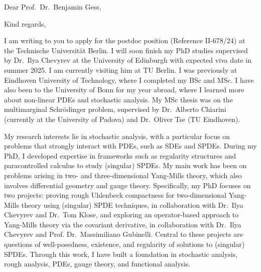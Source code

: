 \documentclass[11pt,a4paper]{moderncv}
\begin{document}
\date{\today}
\opening{Dear Prof.\ Dr.\ Benjamin Gess,}
\closing{Kind regards,\vspace{-2em}}

\makelettertitle
\justifying
I am writing to you to apply for the postdoc position (Reference II-678/24) at the Technische Universität Berlin. I will soon finish my PhD studies supervised by Dr.\ Ilya Chevyrev at the University of Edinburgh with expected viva date in summer 2025. I am currently visiting him at TU Berlin. I was previously at Eindhoven University of Technology, where I completed my BSc and MSc. I have also been to the University of Bonn for my year abroad, where I learned more about non-linear PDEs and stochastic analysis. My MSc thesis was on the multimarginal Schrödinger problem, supervised by Dr.\ Alberto Chiarini (currently at the University of Padova) and Dr.\ Oliver Tse (TU Eindhoven).

My research interests lie in stochastic analysis, with a particular focus on problems that strongly interact with PDEs, such as SDEs and SPDEs. During my PhD, I developed expertise in frameworks such as regularity structures and paracontrolled calculus to study (singular) SPDEs. My main work has been on problems arising in two- and three-dimensional Yang-Mills theory, which also involves differential geometry and gauge theory. Specifically, my PhD focuses on two projects: proving rough Uhlenbeck compactness for two-dimensional Yang-Mills theory using (singular) SPDE techniques, in collaboration with Dr.\ Ilya Chevyrev and Dr.\ Tom Klose, and exploring an operator-based approach to Yang-Mills theory via the covariant derivative, in collaboration with Dr.\ Ilya Chevyrev and Prof. Dr.\ Massimiliano Gubinelli.  Central to these projects are questions of well-posedness, existence, and regularity of solutions to (singular) SPDEs. Through this work, I have built a foundation in stochastic analysis, rough analysis, PDEs, gauge theory, and functional analysis.

\end{document}
